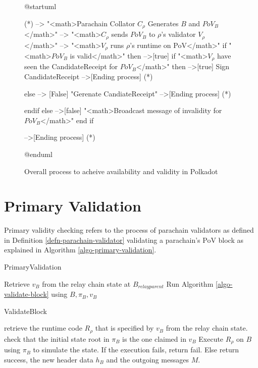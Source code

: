 \begin{figure}[h!]
\label{diag-anv-overall}
\begin{plantuml}
@startuml

(*) --> "<math>Parachain Collator $C_\rho$ Generates  $B$ and $PoV_B$</math>"
    --> "<math>$C_\rho$ sends $PoV_B$ to $\rho$'s validator $V_\rho$</math>"
    --> "<math>$V_{\rho}$ runs $\rho$'s runtime on PoV</math>"
    if "<math>$PoV_B$ is valid</math>" then
    -->[true] if  "<math>$V_{\rho}$ have seen the CandidateReceipt for $PoV_B$</math>" then
    -->[true] Sign CandidateReceipt
    -->[Ending process] (*)

    else
    --> [False] "Gerenate CandiateReceipt"
    -->[Ending process] (*)

    endif
    else
    -->[false] "<math>Broadcast message of invalidity for $PoV_B$</math>"
    end if

  -->[Ending process] (*)

@enduml
\end{plantuml}
\caption{Overall process to acheive availability and validity in Polkadot}
\end{figure}

\section{Primary Validation}
\label{sect-primary-validation}

Primary validity checking refers to the process of parachain validators as defined in Definition \ref{defn-parachain-validator} validating a parachain's PoV block as explained in Algorithm \ref{algo-primary-validation}.

\begin{algorithm}
  \caption[]{\sc PrimaryValidation}
  \label{algo-primary-validation}
  \begin{algorithmic}[1]

    \State Retrieve $v_B$ from the relay chain state at $B_{relay parent}$
    \State Run Algorithm \ref{algo-validate-block} using $B, \pi_B, v_B$
  \end{algorithmic}
\end{algorithm}

\begin{algorithm}
  \caption[]{\sc ValidateBlock}
  \label{algo-validate-block}
  \begin{algorithmic}[1]
    \State retrieve the runtime code $R_\rho$ that is specified by $v_B$ from the relay chain state.
    \State check that the initial state root in $\pi_B$ is the one claimed in $v_B$
    \State Execute $R_\rho$ on $B$ using $\pi_B$ to simulate the state.
    \State If the execution fails, return fail.
    \State Else return success, the new header data $h_B$ and the outgoing messages $M$.
  \end{algorithmic}
\end{algorithm}

